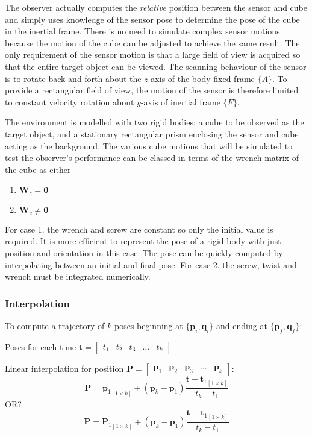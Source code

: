 The observer actually computes the \textit{relative} position between the sensor and cube and simply uses knowledge of the sensor pose to determine the pose of the cube in the inertial frame. There is no need to simulate complex sensor motions because the motion of the cube can be adjusted to achieve the same result. The only requirement of the sensor motion is that a large field of view is acquired so that the entire target object can be viewed. The scanning behaviour of the sensor is to rotate back and forth about the $z$-axis of the body fixed frame $\{A\}$. To provide a rectangular field of view, the motion of the sensor is therefore limited to constant velocity rotation about $y$-axis of inertial frame $\{F\}$.

The environment is modelled with two rigid bodies: a cube to be observed as the target object, and a stationary rectangular prism enclosing the sensor and cube acting as the background. The various cube motions that will be simulated to test the observer's performance can be classed in terms of the wrench matrix of the cube as either
\begin{enumerate}
\item ${\textbf{W}_c} = \textbf{0}$
\item ${\textbf{W}_c} \neq \textbf{0}$
\end{enumerate}

For case 1. the wrench and screw are constant so only the initial value is required. It is more efficient to represent the pose of a rigid body with just position and orientation in this case. The pose can be quickly computed by interpolating between an initial and final pose. For case 2. the screw, twist and wrench must be integrated numerically.

\subsubsection{Interpolation}
To compute a trajectory of $k$ poses beginning at $\{\mathbf{p}_i,\mathbf{q}_i\}$ and ending at $\{\mathbf{p}_f,\mathbf{q}_f\}$:

Poses for each time $\mathbf{t} =
					\begin{bmatrix}
						t_1 & t_2 & t_3 & \dots & t_k
					\end{bmatrix}$

Linear interpolation for position $\mathbf{P}= \begin{bmatrix}
													\mathbf{p}_1 & \mathbf{p}_2 & \mathbf{p}_3 & \dots & \mathbf{p}_k
											   \end{bmatrix}$:
\begin{equation}
	\mathbf{P} = 
	{\mathbf{p}_1}_{[1 \times k]} + (\mathbf{p}_k - \mathbf{p}_1)\frac{\mathbf{t}-{\mathbf{t}_1}_{[1 \times k]}}{t_k - t_1}
\end{equation}
OR?
\begin{equation}
	\mathbf{P} = 
	{\mathbf{P}_1}_{[1 \times k]} + (\mathbf{p}_k - \mathbf{p}_1)\frac{\mathbf{t}-{\mathbf{t}_1}_{[1 \times k]}}{t_k - t_1}
\end{equation}


